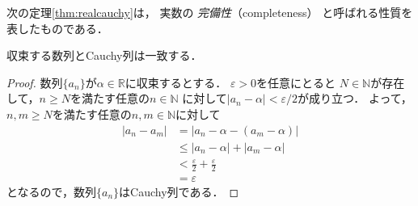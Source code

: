      次の定理\ref{thm:realcauchy}は，
     実数の
     \emph{完備性}（completeness）
     と呼ばれる性質を表したものである．
     \begin{thm}[実数の完備性] \label{thm:realcauchy}
       収束する数列とCauchy列は一致する．
     \end{thm}

     \begin{proof}
       数列$\{ a_n \}$が$\alpha \in \mathbb{R}$に収束するとする．
       $\varepsilon >0$を任意にとると
       $N \in \mathbb{N}$が存在して，$n \geq N$を満たす任意の$n \in \mathbb{N}$
       に対して$\lvert a_n - \alpha \rvert < \varepsilon / 2$が成り立つ．
       よって，$n,m \geq N$を満たす任意の$n,  m \in \mathbb{N}$に対して
       \begin{align*}
         \lvert a_n - a_m \rvert 
         & = \lvert a_n - \alpha - ( a_m - \alpha ) \rvert \\
         & \leq \lvert a_n - \alpha \rvert + \lvert a_m - \alpha \rvert \\
         & < \frac{ \varepsilon }{2} + \frac{ \varepsilon }{2} \\
         & = \varepsilon 
       \end{align*}
       となるので，数列$\{ a_n \}$はCauchy列である．


\end{proof}
